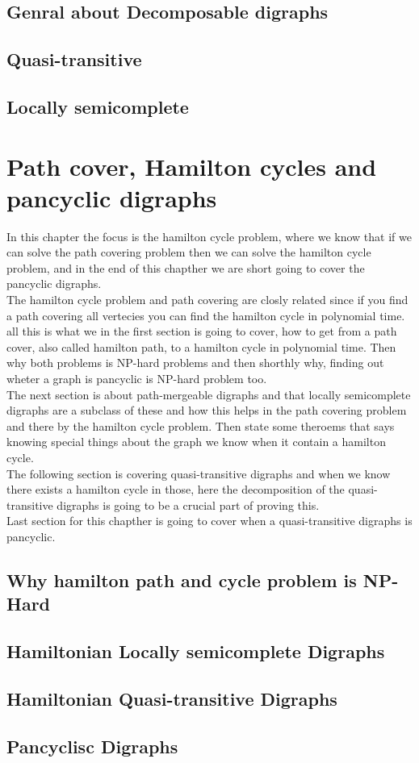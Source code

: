 \section{Genral about Decomposable digraphs}
\label{sec:gdecomposable}

\section{Quasi-transitive}
\label{sec:quasi}

\section{Locally semicomplete}
\label{sec:locally}


\chapter{Path cover, Hamilton cycles and pancyclic digraphs}
\label{chap:hamilton}
In this chapter the focus is the hamilton cycle problem, where we know that if we can solve the path covering problem then we can solve the hamilton cycle problem, and in the end of this chapther we are short going to cover the pancyclic digraphs.\\
The hamilton cycle problem and path covering are closly related since if you find a path covering all vertecies you can find the hamilton cycle in polynomial time. all this is what we in the first section is going to cover, how to get from a path cover, also called hamilton path, to a hamilton cycle in polynomial time. Then why both problems is NP-hard problems and then shorthly why, finding out wheter a graph is pancyclic is NP-hard problem too.\\
The next section is about path-mergeable digraphs and that locally semicomplete digraphs are a subclass of these and how this helps in the path covering problem and there by the hamilton cycle problem. Then state some theroems that says knowing special things about the graph we know when it contain a hamilton cycle. \\
The following section is covering quasi-transitive digraphs and when we know there exists a hamilton cycle in those, here the decomposition of the quasi-transitive digraphs is going to be a crucial part of proving this. \\
Last section for this chapther is going to cover when a quasi-transitive digraphs is pancyclic.

\section{Why hamilton path and cycle problem is NP-Hard}
\label{sec:hNP}

\section{Hamiltonian Locally semicomplete Digraphs}
\label{sec:hlocally}

\section{Hamiltonian Quasi-transitive Digraphs}
\label{sec:hquasi}

\section{Pancyclisc Digraphs}
\label{sec:pancyclic}

